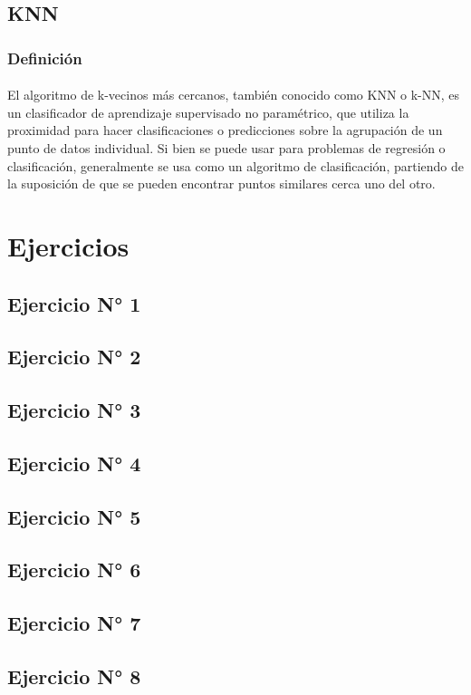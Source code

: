 \documentclass{article}
\begin{document}
\subsection{KNN}
\subsubsection*{Definición}
\paragraph{}
El algoritmo de k-vecinos más cercanos, también conocido como KNN o k-NN, es un clasificador de aprendizaje supervisado no paramétrico, que utiliza la proximidad para hacer clasificaciones o predicciones sobre la agrupación de un punto de datos individual. Si bien se puede usar para problemas de regresión o clasificación, generalmente se usa como un algoritmo de clasificación, partiendo de la suposición de que se pueden encontrar puntos similares cerca uno del otro.


\section{Ejercicios}
\subsection{Ejercicio N° 1}
\subsection{Ejercicio N° 2}
\subsection{Ejercicio N° 3}
\subsection{Ejercicio N° 4}
\subsection{Ejercicio N° 5}
\subsection{Ejercicio N° 6}
\subsection{Ejercicio N° 7}
\subsection{Ejercicio N° 8}
\end{document}
